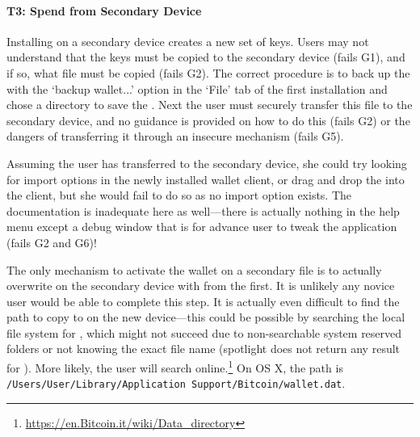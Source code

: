 \paragraph{T3: Spend from Secondary Device} Installing \Bitcoinclient on a secondary device creates a new set of keys. Users may not understand that the keys must be copied to the secondary device (fails G1), and if so, what file must be copied (fails G2). The correct procedure is to back up the \walletfile with the `backup wallet...' option in the `File' tab of the first installation and chose a directory to save the \walletfile. Next the user must securely transfer this file to the secondary device, and no guidance is provided on how to do this (fails G2) or the dangers of transferring it through an insecure mechanism (fails G5).

Assuming the user has transferred \walletfile to the secondary device, she could try looking for import options in the newly installed wallet client, or drag and drop the \walletfile into the client, but she would fail to do so as no import option exists. The documentation is inadequate here as well---there is actually nothing in the help menu except a debug window that is for advance user to tweak the application (fails G2 and G6)!

The only mechanism to activate the wallet on a secondary file is to actually overwrite \walletfile on the secondary device with \walletfile from the first. It is unlikely any novice user would be able to complete this step. It is actually even difficult to find the path to copy \walletfile to on the new device---this could be possible by searching the local file system for \walletfile, which might not succeed due to non-searchable system reserved folders or not knowing the exact file name (spotlight does not return any result for \walletfile). More likely, the user will search online.\footnote{\url{https://en.Bitcoin.it/wiki/Data_directory}} On OS X, the path is \texttt{/Users/User/Library/Application Support/Bitcoin/wallet.dat}.

